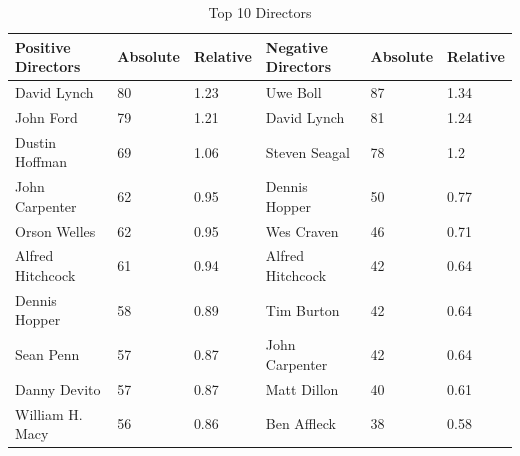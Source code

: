 \documentclass[
10pt, %
a4paper, %
oneside, %
headinclude,footinclude, %
] {book}%
\begin{document}
\begin{table}[hbtp]
\centering
\caption{Top 10 Directors}
\label{Table 7}
\begin{tabular}{llllll}
\toprule
Positive Directors & Absolute & Relative & Negative Directors                                    & Absolute & Relative \\ \midrule
David Lynch        & 80       & 1.23     & Uwe Boll                                              & 87       & 1.34     \\
John Ford          & 79       & 1.21     & David Lynch                                           & 81       & 1.24     \\
Dustin Hoffman     & 69       & 1.06     & Steven Seagal                                         & 78       & 1.2      \\
John Carpenter     & 62       & 0.95     & Dennis Hopper                                         & 50       & 0.77     \\
Orson Welles       & 62       & 0.95     & Wes Craven                                            & 46       & 0.71     \\
Alfred Hitchcock   & 61       & 0.94     & Alfred Hitchcock                                      & 42       & 0.64     \\
Dennis Hopper      & 58       & 0.89     & Tim Burton                                            & 42       & 0.64     \\
Sean Penn          & 57       & 0.87     & John Carpenter                                        & 42       & 0.64     \\
Danny Devito       & 57       & 0.87     & Matt Dillon                                           & 40       & 0.61     \\
William H. Macy    & 56       & 0.86     & Ben Affleck								& 38       & 0.58    \\ \bottomrule
\end{tabular}
\end{table}
\end{document}
